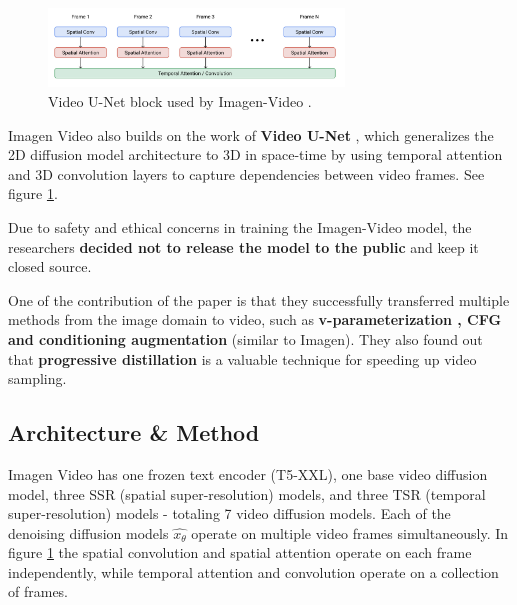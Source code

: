 \begin{figure}
    \centering
    \includegraphics[width=0.7\textwidth]{images/imagen_video/video_u_net.png}
    \caption{Video U-Net block \cite{video_diffusion_models} used by Imagen-Video \cite{imagen_video}.}
    \label{fig:imagen_video_video_unet}
\end{figure}


Imagen Video also builds on the work of \textbf{Video U-Net} \cite{video_diffusion_models}, which generalizes the 2D diffusion model architecture to 3D in space-time by using temporal attention and 3D convolution layers to capture dependencies between video frames. See figure \ref{fig:imagen_video_video_unet}.

Due to safety and ethical concerns in training the Imagen-Video model, the researchers \textbf{decided not to release the model to the public} and keep it closed source.

One of the contribution of the paper is that they successfully transferred multiple methods from the image domain to video, such as \textbf{v-parameterization \cite{v_prediction}, CFG and conditioning augmentation} \cite{cascaded_diffusion_models} (similar to Imagen). They also found out that \textbf{progressive distillation} \cite{v_prediction} \cite{meng2023distillation} is a valuable technique for speeding up video sampling.














\subsection{Architecture \& Method}

Imagen Video has one frozen text encoder (T5-XXL), one base video diffusion model, three SSR (spatial super-resolution) models, and three TSR (temporal super-resolution) models - totaling 7 video diffusion models. Each of the denoising diffusion models $\hat{x_\theta}$ operate on multiple video frames simultaneously. In figure \ref{fig:imagen_video_video_unet} the spatial convolution and spatial attention operate on each frame independently, while temporal attention and convolution operate on a collection of frames.

